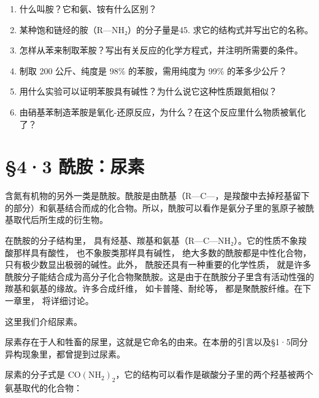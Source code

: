 \begin{enumerate}
\item
  什么叫胺？它和氨、铵有什么区别？
\item
  某种饱和链烃的胺（R---NH₂）的分子量是45. 求它的结构式并写出它的名称。
\item
  怎样从苯来制取苯胺？写出有关反应的化学方程式，并注明所需要的条件。
\item
  制取 200 公斤、纯度是 98\% 的苯胺，需用纯度为 99\% 的苯多少公斤？
\item
  用什么实验可以证明苯胺具有碱性？为什么说它这种性质跟氮相似？
\item
  由硝基苯制造苯胺是氧化-还原反应，为什么？在这个反应里什么物质被氧化了？
\end{enumerate}

\section{§4·3 酰胺：尿素}

含氮有机物的另外一类是酰胺。酰胺是由酰基（R---C---，是羧酸中去掉羟基留下的部分）和氨基结合而成的化合物。所以，酰胺可以看作是氨分子里的氢原子被酰基取代后所生成的衍生物。

在酰胺的分子结构里，
具有烃基、羰基和氨基（R---C---NH₂）。它的性质不象羧酸那样具有酸性，
也不象胺类那样具有碱性， 绝大多数的酰胺都是中性化合物，
只有极少数显出极弱的碱性。此外， 酰胺还具有一种重要的化学性质，
就是许多酰胺分子能结合成为高分子化合物聚酰胺。这是由于在酰胺分子里含有活动性强的羰基和氨基的缘故。许多合成纤维，
如卡普隆、耐纶等， 都是聚酰胺纤维。在下一章里， 将详细讨论。

这里我们介绍尿素。

尿素存在于人和牲畜的尿里，这就是它命名的由来。在本册的引言以及§1·5同分异构现象里，都曾提到过尿素。

尿素的分子式是
\(\mathrm{CO(NH_2)_2}\)，它的结构可以看作是碳酸分子里的两个羟基被两个氨基取代的化合物：

\begin{figure}
\centering
{}


\end{figure}

